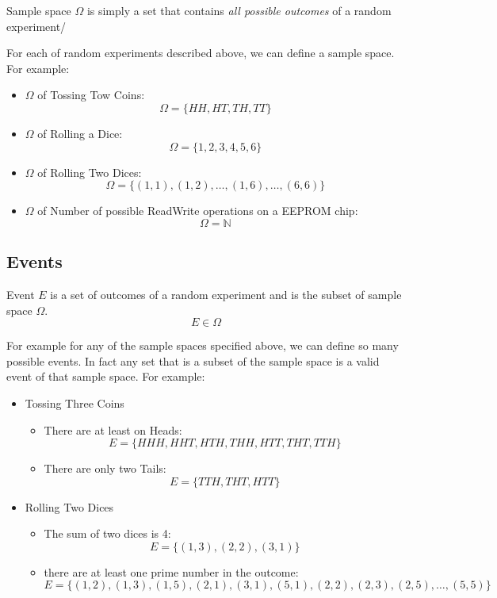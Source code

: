 \begin{definition}
	
	Sample space $\Omega$ is simply a set that contains \emph{all possible outcomes} of a random experiment/
	
\end{definition}

For each of random experiments described above, we can define a sample space. For example:

\begin{itemize}
	\item $\Omega$ of Tossing Tow Coins: $$\Omega = \{ HH,HT,TH,TT \}$$
	\item $\Omega$ of Rolling a Dice: $$\Omega = \{ 1,2,3,4,5,6 \}$$
	\item $\Omega$ of Rolling Two Dices: $$\Omega = \{ (1,1),(1,2), \ldots, (1,6), \ldots ,(6,6)  \}$$
	\item $\Omega$ of Number of possible ReadWrite operations on a EEPROM chip: $$\Omega = \mathbb{N}$$
\end{itemize}



\subsection{Events}
\begin{definition}[Events]
	Event $E$ is a set of outcomes of a random experiment and is the subset of sample space $\Omega$. 
	$$E \in \Omega$$
\end{definition}


For example for any of the sample spaces specified above, we can define so many possible events. In fact any set that is a subset of the sample space is a valid event of that sample space. For example:

\begin{itemize}
	
	\item Tossing Three Coins
	\begin{itemize}
		\item There are at least on Heads: $$E = \{ HHH,HHT,HTH,THH,HTT,THT,TTH \}$$
		\item There are only two Tails: $$E = \{ TTH,THT,HTT \}$$
	\end{itemize}
	
	\item Rolling Two Dices
	\begin{itemize}
		\item The sum of two dices is 4: $$E = \{ (1,3),(2,2),(3,1) \}$$
		\item there are at least one prime number in the outcome:
		$$E = \{ (1,2),(1,3),(1,5),(2,1),(3,1),(5,1),(2,2),(2,3),(2,5), \ldots ,(5,5)\}$$
	\end{itemize}
	
\end{itemize}

